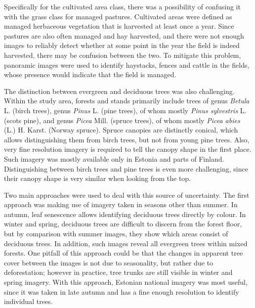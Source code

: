 \documentclass[a4paper,10pt]{book}
\begin{document}
Specifically for the cultivated area class, there was a possibility of confusing it with the grass class for managed pastures. Cultivated areas were defined as managed herbaceous vegetation that is harvested at least once a year. Since pastures are also often managed and hay harvested, and there were not enough images to reliably detect whether at some point in the year the field is indeed harvested, there may be confusion between the two. To mitigate this problem, panoramic images were used to identify haystacks, fences and cattle in the fields, whose presence would indicate that the field is managed.

The distinction between evergreen and deciduous trees was also challenging. Within the study area, forests and stands primarily include trees of genus \textit{Betula} L. (birch trees), genus \textit{Pinus} L. (pine trees), of whom mostly \textit{Pinus sylvestris} L. (scots pine), and genus \textit{Picea} Mill. (spruce trees), of whom mostly \textit{Picea abies} (L.) H. Karst. (Norway spruce). Spruce canopies are distinctly conical, which allows distinguishing them from birch trees, but not from young pine trees. Also, very fine resolution imagery is required to tell the canopy shape in the first place. Such imagery was mostly available only in Estonia and parts of Finland. Distinguishing between birch trees and pine trees is even more challenging, since their canopy shape is very similar when looking from the top.

Two main approaches were used to deal with this source of uncertainty. The first approach was making use of imagery taken in seasons other than summer. In autumn, leaf senescence allows identifying deciduous trees directly by colour. In winter and spring, deciduous trees are difficult to discern from the forest floor, but by comparison with summer images, they show which areas consist of deciduous trees. In addition, such images reveal all evergreen trees within mixed forests. One pitfall of this approach could be that the changes in apparent tree cover between the images is not due to seasonality, but rather due to deforestation; however in practice, tree trunks are still visible in winter and spring imagery. With this approach, Estonian national imagery was most useful, since it was taken in late autumn and has a fine enough resolution to identify individual trees.
\end{document}
